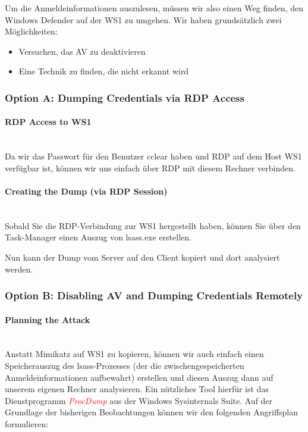 Um die Anmeldeinformationen auszulesen, müssen wir also einen Weg finden, den Windows Defender auf der WS1 zu umgehen. Wir haben grundsätzlich zwei Möglichkeiten:\\
\begin{itemize}
    \item Versuchen, das AV zu deaktivieren
    \item Eine Technik zu finden, die nicht erkannt wird
\end{itemize} 

\subsubsection{Option A: Dumping Credentials via RDP Access}
\paragraph{RDP Access to WS1}\mbox{} \\
Da wir das Passwort für den Benutzer cclear haben und RDP auf dem Host WS1 verfügbar ist, können wir uns einfach über RDP mit diesem Rechner verbinden.

\paragraph{Creating the Dump (via RDP Session)}\mbox{} \\
Sobald Sie die RDP-Verbindung zur WS1 hergestellt haben, können Sie über den Task-Manager einen Auszug von lsass.exe erstellen.

Nun kann der Dump vom Server auf den Client kopiert und dort analysiert werden.

\subsubsection{Option B: Disabling AV and Dumping Credentials Remotely}

\paragraph{Planning the Attack}\mbox{} \\
Anstatt Mimikatz auf WS1 zu kopieren, können wir auch einfach einen Speicherauszug des lsass-Prozesses (der die zwischengespeicherten Anmeldeinformationen aufbewahrt) erstellen und diesen Auszug dann auf unserem eigenen Rechner analysieren.
Ein nützliches Tool hierfür ist das Dienstprogramm \textcolor{red}{\textit{ProcDump}} aus der Windows Sysinternals Suite.
Auf der Grundlage der bisherigen Beobachtungen können wir den folgenden Angriffsplan formulieren:\\

